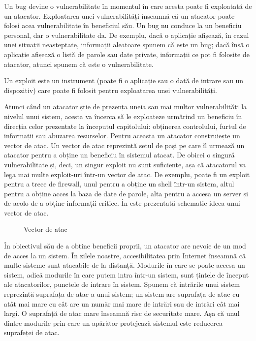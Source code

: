 Un bug devine o vulnerabilitate în momentul în care acesta poate fi exploatată de un atacator. Exploatarea unei vulnerabilități înseamnă că un atacator poate folosi acea vulnerabilitate în beneficiul său. Un bug nu conduce la un beneficiu personal, dar o vulnerabilitate da. De exemplu, dacă o aplicație afișează, în cazul unei situații neașteptate, informații aleatoare spunem că este un bug; dacă însă o aplicație afișează o listă de parole sau date private, informații ce pot fi folosite de atacator, atunci spunem că este o vulnerabilitate.

Un exploit este un instrument (poate fi o aplicație sau o dată de intrare sau un dispozitiv) care poate fi folosit pentru exploatarea unei vulnerabilități.

Atunci când un atacator știe de prezența uneia sau mai multor vulnerabilități la nivelul unui sistem, acesta va încerca să le exploateze urmărind un beneficiu în direcția celor prezentate la începutul capitolului: obținerea controlului, furtul de informații sau abuzarea resurselor. Pentru aceasta un atacator construiește un vector de atac. Un vector de atac reprezintă setul de pași pe care îl urmează un atacator pentru a obține un beneficiu în sistemul atacat. De obicei o singură vulnerabilitate și, deci, un singur exploit nu sunt suficiente, așa că atacatorul va lega mai multe exploit-uri într-un vector de atac. De exemplu, poate fi un exploit pentru a trece de firewall, unul pentru a obține un shell într-un sistem, altul pentru a obține acces la baza de date de parole, alta pentru a accesa un server și de acolo de a obține informații critice. În  este prezentată schematic ideea unui vector de atac.

\begin{figure}[htbp]
  \centering
  \def\svgwidth{\columnwidth}
  
  \caption{Vector de atac}
  \label{fig:sec:attack-vector}
\end{figure}

În obiectivul său de a obține beneficii proprii, un atacator are nevoie de un mod de acces la un sistem. În zilele noastre, accesibilitatea prin Internet înseamnă că multe sisteme sunt atacabile de la distanță. Modurile în care se poate accesa un sistem, adică modurile în care putem intra într-un sistem, sunt țintele de început ale atacatorilor, punctele de intrare în sistem. Spunem că intrările unui sistem reprezintă suprafața de atac a unui sistem; un sistem are suprafața de atac cu atât mai mare cu cât are un număr mai mare de intrări sau de intrări cât mai largi. O suprafață de atac mare înseamnă risc de securitate mare. Așa că unul dintre modurile prin care un apărător protejează sistemul este reducerea suprafeței de atac.

